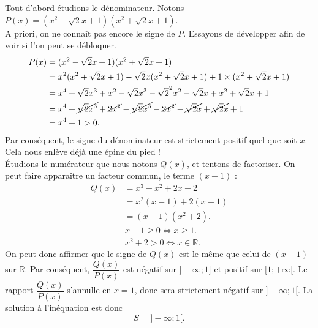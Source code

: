 \documentclass[12pt,
addpoints,
fleqn
]{exam}
\begin{document}
\begin{questions}
\begin{solution}
        Tout d'abord étudions le dénominateur. Notons $P(x)=(x^2-\sqrt{2}x +1)(x^2+\sqrt{2}x+1)$.\\
        A priori, on ne connaît pas encore le signe de $P$. Essayons de développer afin de voir si l'on peut se débloquer.
        \begin{align*}
            P(x) & =(x^2-\sqrt{2}x +1)(x^2+\sqrt{2}x+1)                                                                                             \\
                 & = x^2(x^2 + \sqrt{2}x+1) -\sqrt{2}x(x^2+\sqrt{2}x+1) + 1\times(x^2 +\sqrt{2}x+1)                                                 \\
                 & = x^4 + \sqrt{2}x^3 + x^2 - \sqrt{2}x^3 - \sqrt{2}^2x^2 - \sqrt{2}x + x^2 + \sqrt{2}x +1                                         \\
                 & = x^4 + \cancel{\sqrt{2}x^3} + \cancel{2x^2} - \cancel{\sqrt{2}x^3} - \cancel{2x^2} - \cancel{\sqrt{2}x} + \cancel{\sqrt{2}x} +1 \\
                 & = x^4 +1 > 0.
        \end{align*}
        Par conséquent, le signe du dénominateur est strictement positif quel que soit $x$. Cela nous enlève déjà une épine du pied !\\
        \'Etudions le numérateur que nous notons $Q(x)$, et tentons de factoriser. On peut faire apparaître un facteur commun, le terme $(x-1)$ :
        \begin{align*}
            Q(x) & = x^3-x^2 + 2x - 2  \\
                 & = x^2(x-1) + 2(x-1) \\
                 & = (x-1)(x^2 + 2).
        \end{align*}
        \begin{align*}
             & x-1 \geq 0 \iff x\geq 1.       \\
             & x^2+2 > 0 \iff x\in\mathbb{R}.
        \end{align*}
        On peut donc affirmer que le signe de $Q(x)$ est le même que celui de $(x-1)$ sur $\mathbb{R}$. Par conséquent, $\dfrac{Q(x)}{P(x)}$ est négatif sur $]-\infty;1]$ et positif
        sur $[1;+\infty[$. Le rapport $\dfrac{Q(x)}{P(x)}$ s'annulle en $x=1$, donc sera strictement négatif sur $]-\infty ; 1[$.
        La solution à l'inéquation est donc
        \[
            \boxed{S=]-\infty ; 1[}.
        \]
    \end{solution}


\end{questions}
\end{document}
